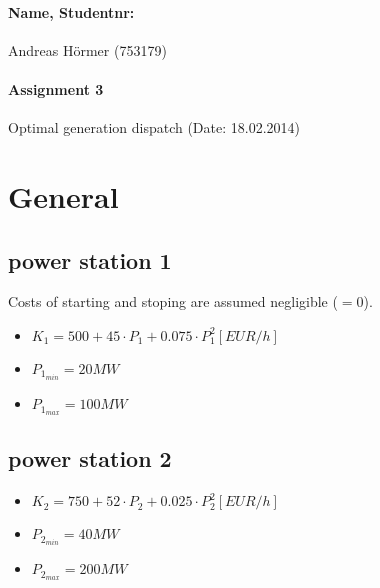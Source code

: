 \documentclass{article}
\begin{document}
	\paragraph{Name, Studentnr: }Andreas H\"ormer (753179)
	\paragraph{Assignment 3}Optimal generation dispatch (Date: 18.02.2014)
	\section{General}
		\subsection{power station 1}
			Costs of starting and stoping are assumed negligible ($=0$).
			\begin{itemize}
				\item $K_1=500+45\cdot P_1+0.075\cdot P_1^2 [EUR/h]$
				\item $P_{1_{min}}=20MW$
				\item $P_{1_{max}}=100MW$
			\end{itemize}
		\subsection{power station 2}
			\begin{itemize}
				\item $K_2=750+52\cdot P_2+0.025\cdot P_2^2 [EUR/h]$
				\item $P_{2_{min}}=40MW$
				\item $P_{2_{max}}=200MW$
			\end{itemize}
\end{document}
